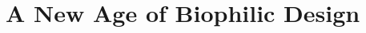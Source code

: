 \documentclass{article}
\begin{document}

\clearpage
\section{A New Age of Biophilic Design}
\label{sec:biophilic}
\end{document}
